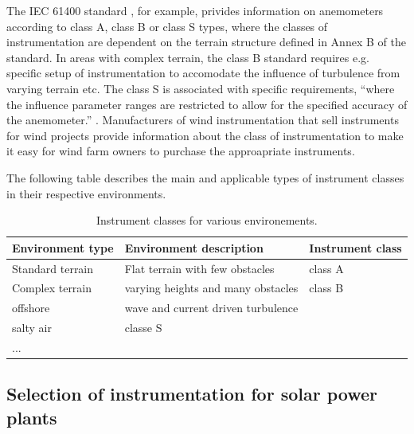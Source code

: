 The IEC 61400 standard \cite{iec61400-12-1-2005}, for example, privides information on anemometers according to class A, class B or class S types, where the classes of instrumentation are dependent on the terrain structure defined in Annex B of the standard. In areas with complex terrain, the class B standard requires e.g. specific setup of instrumentation to accomodate the influence of turbulence from varying terrain etc. 
The class S is associated with specific requirements, ``where  the  influence  parameter  ranges  are  restricted  to  allow  for  the  specified  accuracy  of  the  anemometer.'' \cite{iec61400-12-1-2005}. Manufacturers of wind instrumentation that sell instruments for wind projects provide information about the class of instrumentation to make it easy for wind farm owners to purchase the approapriate instruments. 


The following table describes the main and applicable types of instrument classes in their respective environments. 

\begin{table}[h!]
    \caption{Instrument classes for various environements.{\color{red}{Comments from COM (21.08.2021:NEEDS DISCUSSION and more info}}}
    \centering
    \begin{tabular}{p{4cm}| p{7cm} | p{3cm}}
     \textbf{Environment type}  & \textbf{Environment description} & \textbf{Instrument class} \\ \hline 
     Standard terrain  & Flat terrain with few obstacles & class A \\
     Complex terrain   & varying heights and many obstacles  &  class B\\
     offshore          & wave and current driven turbulence \\ salty air & classe S \\
     ... & & \\
    \end{tabular}
    \label{tab:initial_considerations}
\end{table}



\subsection{Selection of instrumentation for solar power plants}\label{subsec:selection_of_instrumentation}




